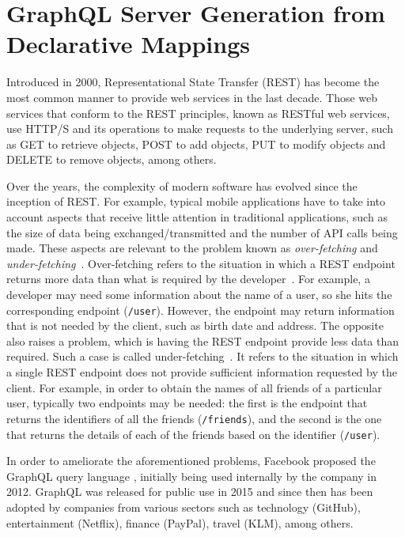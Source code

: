\section{GraphQL Server Generation from Declarative Mappings}
\label{chap6_morphgraphql}
Introduced in 2000, Representational State Transfer (REST) has become the most common manner to provide web services in the last decade. Those web services that conform to the REST principles, known as RESTful web services, use HTTP/S and its operations to make requests to the underlying server, such as GET to retrieve objects, POST to add objects, PUT to modify objects and DELETE to remove objects, among others.

Over the years, the complexity of modern software has evolved since the inception of REST. For example, typical mobile applications have to take into account aspects that receive little attention in traditional applications, such as the size of data being exchanged/transmitted and the number of API calls being made. These aspects are relevant to the problem known as \textit{over-fetching} and \textit{under-fetching}~\citep{bryant2017graphql,vogel2017experiences,mukhiya2019graphql}. Over-fetching refers to the situation in which a REST endpoint returns more data than what is required by the developer~\citep{bryant2017graphql,vogel2017experiences,mukhiya2019graphql}. For example, a developer may need some information about the name of a user, so she hits the corresponding endpoint (\texttt{/user}). However, the endpoint may return information that is not needed by the client, such as birth date and address. The opposite also raises a problem, which is having the REST endpoint provide less data than required. Such a case is called under-fetching~\citep{bryant2017graphql,vogel2017experiences,mukhiya2019graphql}. It refers to the situation in which a single REST endpoint does not provide sufficient information requested by the client. For example, in order to obtain the names of all friends of a particular user, typically two endpoints may be needed: the first is the endpoint that returns the identifiers of all the friends (\texttt{/friends}), and the second is the one that returns the details of each of the friends based on the identifier (\texttt{/user}).

In order to ameliorate the aforementioned problems, Facebook proposed the GraphQL query language \citep{graphql}, initially being used internally by the company in 2012. GraphQL was released for public use in 2015 and since then has been adopted by companies from various sectors such as technology (GitHub), entertainment (Netflix), finance (PayPal), travel (KLM), among others. 

